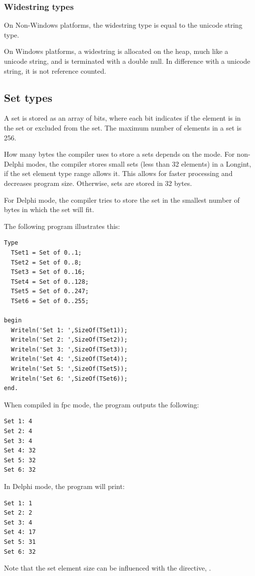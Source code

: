 \subsubsection{Widestring types}

On Non-Windows platforms, the widestring type is equal to the unicode string type.

On Windows platforms, a widestring is allocated on the heap, much like a unicode
string, and is terminated with a double null. In difference with a unicode
string, it is not reference counted.

\subsection{Set types}
A set is stored as an array of bits, where each bit indicates
if the element is in the set or excluded from the set. 
The maximum number of elements in a set is 256.

How many bytes the compiler uses to store a sets depends on the mode.
For non-Delphi modes, the compiler stores small sets (less than 32 elements) in a Longint, 
if the set element type range allows it. This allows for faster processing and decreases
program size. Otherwise, sets are stored in 32 bytes.

For Delphi mode, the compiler tries to store the set in the smallest number
of bytes in which the set will fit. 

The following program illustrates this:
\begin{verbatim} 
Type
  TSet1 = Set of 0..1;
  TSet2 = Set of 0..8;
  TSet3 = Set of 0..16;
  TSet4 = Set of 0..128;
  TSet5 = Set of 0..247;
  TSet6 = Set of 0..255;

begin
  Writeln('Set 1: ',SizeOf(TSet1));
  Writeln('Set 2: ',SizeOf(TSet2));
  Writeln('Set 3: ',SizeOf(TSet3));
  Writeln('Set 4: ',SizeOf(TSet4));
  Writeln('Set 5: ',SizeOf(TSet5));
  Writeln('Set 6: ',SizeOf(TSet6));
end.
\end{verbatim}
When compiled in fpc mode, the program outputs the following:
\begin{verbatim}
Set 1: 4
Set 2: 4
Set 3: 4
Set 4: 32
Set 5: 32
Set 6: 32
\end{verbatim}
In Delphi mode, the program will print:
\begin{verbatim}
Set 1: 1
Set 2: 2
Set 3: 4
Set 4: 17
Set 5: 31
Set 6: 32
\end{verbatim}

Note that the set element size can be influenced with the 
directive, .

